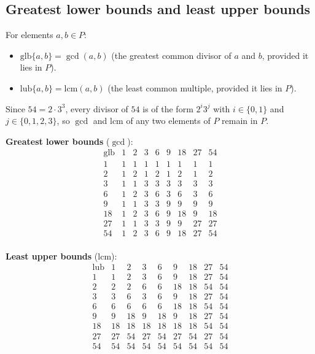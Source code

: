 \subsection{Greatest lower bounds and least upper bounds}

For elements $a, b \in P$:
\begin{itemize}
    \item $\mathrm{glb}\{a,b\} = \gcd(a,b)$ (the greatest common divisor of
          $a$ and $b$, provided it lies in $P$).
    \item $\mathrm{lub}\{a,b\} = \mathrm{lcm}(a,b)$ (the least common multiple,
          provided it lies in $P$).
\end{itemize}

Since $54 = 2 \cdot 3^3$, every divisor of $54$ is of the form $2^i 3^j$ with
$i \in \{0,1\}$ and $j \in \{0,1,2,3\}$, so $\gcd$ and $\mathrm{lcm}$ of any
two elements of $P$ remain in $P$.

\medskip
\noindent\textbf{Greatest lower bounds} ($\gcd$):
\[
\begin{array}{c|cccccccc}
    \mathrm{glb} & 1 & 2 & 3 & 6 & 9 & 18 & 27 & 54 \\
    \hline
    1  & 1 & 1 & 1 & 1 & 1 & 1  & 1  & 1  \\
    2  & 1 & 2 & 1 & 2 & 1 & 2  & 1  & 2  \\
    3  & 1 & 1 & 3 & 3 & 3 & 3  & 3  & 3  \\
    6  & 1 & 2 & 3 & 6 & 3 & 6  & 3  & 6  \\
    9  & 1 & 1 & 3 & 3 & 9 & 9  & 9  & 9  \\
    18 & 1 & 2 & 3 & 6 & 9 & 18 & 9  & 18 \\
    27 & 1 & 1 & 3 & 3 & 9 & 9  & 27 & 27 \\
    54 & 1 & 2 & 3 & 6 & 9 & 18 & 27 & 54 \\
\end{array}
\]

\noindent\textbf{Least upper bounds} ($\mathrm{lcm}$):
\[
\begin{array}{c|cccccccc}
    \mathrm{lub} & 1 & 2 & 3 & 6 & 9 & 18 & 27 & 54 \\
    \hline
    1  & 1  & 2  & 3  & 6  & 9  & 18 & 27 & 54 \\
    2  & 2  & 2  & 6  & 6  & 18 & 18 & 54 & 54 \\
    3  & 3  & 6  & 3  & 6  & 9  & 18 & 27 & 54 \\
    6  & 6  & 6  & 6  & 6  & 18 & 18 & 54 & 54 \\
    9  & 9  & 18 & 9  & 18 & 9  & 18 & 27 & 54 \\
    18 & 18 & 18 & 18 & 18 & 18 & 18 & 54 & 54 \\
    27 & 27 & 54 & 27 & 54 & 27 & 54 & 27 & 54 \\
    54 & 54 & 54 & 54 & 54 & 54 & 54 & 54 & 54 \\
\end{array}
\]

